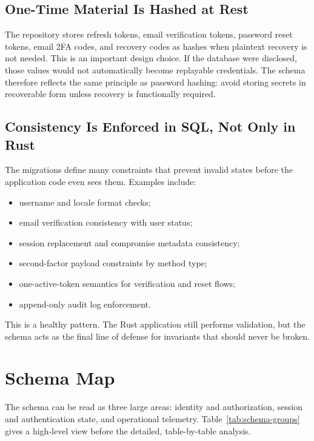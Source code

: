 \documentclass[11pt,a4paper]{article}
\begin{document}
\subsection{One-Time Material Is Hashed at Rest}

The repository stores refresh tokens, email verification tokens, password reset tokens, email 2FA codes, and recovery codes as hashes when plaintext recovery is not needed. This is an important design choice. If the database were disclosed, those values would not automatically become replayable credentials. The schema therefore reflects the same principle as password hashing: avoid storing secrets in recoverable form unless recovery is functionally required.

\subsection{Consistency Is Enforced in SQL, Not Only in Rust}

The migrations define many constraints that prevent invalid states before the application code even sees them. Examples include:

\begin{itemize}
  \item username and locale format checks;
  \item email verification consistency with user status;
  \item session replacement and compromise metadata consistency;
  \item second-factor payload constraints by method type;
  \item one-active-token semantics for verification and reset flows;
  \item append-only audit log enforcement.
\end{itemize}

This is a healthy pattern. The Rust application still performs validation, but the schema acts as the final line of defense for invariants that should never be broken.

\section{Schema Map}

The schema can be read as three large areas: identity and authorization, session and authentication state, and operational telemetry. Table~\ref{tab:schema-groups} gives a high-level view before the detailed, table-by-table analysis.
\end{document}

